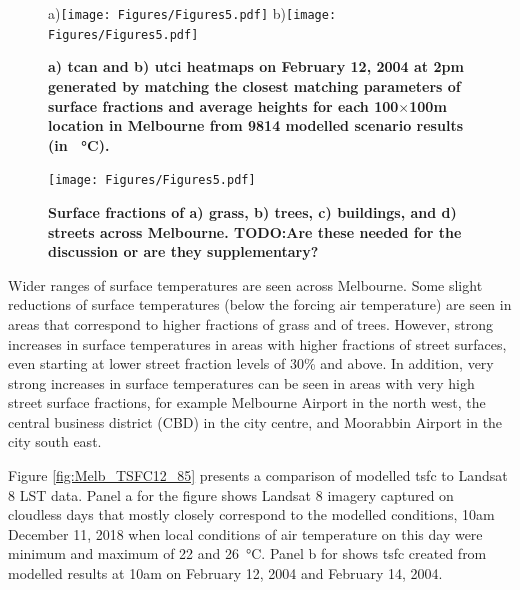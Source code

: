 \documentclass[final,3p,times,authoryear]{elsarticle}
\begin{document}
\begin{figure}
\centering
a)\texttt{[image: Figures/Figures5.pdf]}
b)\texttt{[image: Figures/Figures5.pdf]}
\caption{\bf a) \gls{tcan} and b) \gls{utci} heatmaps on February 12, 2004 at 2pm generated by matching the closest matching parameters of surface fractions and average heights for each 100$\times$100m location in Melbourne from 9814 modelled scenario results (in \SI{}{\degreeCelsius}). }
 \label{fig:TaMelb}  \label{fig:utciMelb}
\end{figure}

\begin{figure}
\centering
\texttt{[image: Figures/Figures5.pdf]}
\caption{\bf Surface fractions of a) grass, b) trees, c) buildings, and d) streets across Melbourne. TODO:Are these needed for the discussion or are they supplementary?}
 \label{fig:melfracs}
\end{figure}


Wider ranges of surface temperatures are seen across Melbourne. Some slight reductions of surface temperatures (below the forcing air temperature) are seen in areas that correspond to higher fractions of grass and of trees. However, strong increases in surface temperatures in areas with higher fractions of street surfaces, even starting at lower street fraction levels of 30\% and above.  In addition, very strong increases in surface temperatures can be seen in areas with very high street surface fractions, for example Melbourne Airport in the north west, the central business district (CBD) in the city centre, and Moorabbin Airport in the city south east.

Figure \ref{fig:Melb_TSFC12_85} presents a comparison of modelled \gls{tsfc} to Landsat 8 LST data. Panel a for the figure shows Landsat 8 imagery captured on cloudless days that mostly closely correspond to the modelled conditions, 10am December 11, 2018 when local conditions of air temperature on this day were minimum and maximum of 22 and 26\SI{}{\degreeCelsius}. Panel b for shows \gls{tsfc} created from modelled results at 10am on February 12, 2004 and February 14, 2004. 
\end{document}
